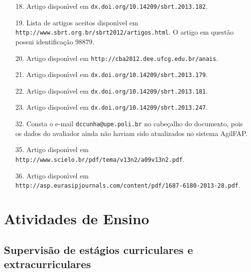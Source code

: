\documentclass[a4paper,oneside,10pt]{article}
\newcounter{document}%
\begin{document}
\begin{itemize}

\item [18.] Artigo dispon\'{\i}vel em \verb"dx.doi.org/10.14209/sbrt.2013.182".
\item [19.] Lista de artigos aceitos dispon\'{\i}vel em \verb"http://www.sbrt.org.br/sbrt2012/artigos.html". O artigo em quest\~{a}o possui identifica\c{c}\~{a}o 98879.
\item [20.] Artigo dispon\'{\i}vel em \verb"http://cba2012.dee.ufcg.edu.br/anais".
\item [21.] Artigo dispon\'{\i}vel em \verb"dx.doi.org/10.14209/sbrt.2013.179".
\item [22.] Artigo dispon\'{\i}vel em \verb"dx.doi.org/10.14209/sbrt.2013.181".
\item [23.] Artigo dispon\'{\i}vel em \verb"dx.doi.org/10.14209/sbrt.2013.247".

\item [32.] Consta o e-mail \verb"dccunha@upe.poli.br" no cabe\c{c}alho do documento, pois os dados do avaliador ainda n\~{a}o haviam sido atualizados no sistema AgilFAP.

\item [35.] Artigo dispon\'{\i}vel em \verb"http://www.scielo.br/pdf/tema/v13n2/a09v13n2.pdf".
\item [36.] Artigo dispon\'{\i}vel em \verb"http://asp.eurasipjournals.com/content/pdf/1687-6180-2013-28.pdf".

\end{itemize}


\newpage
\section{Atividades de Ensino}


\subsection{Supervis\~{a}o de est\'{a}gios curriculares e extracurriculares}
\vspace{0.3cm}
\end{document}
